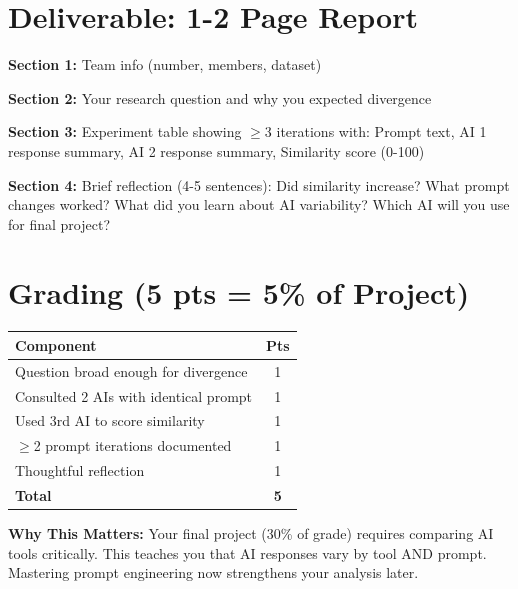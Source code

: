 \documentclass[10pt]{article}
\begin{document}
\section*{Deliverable: 1-2 Page Report}

\textbf{Section 1:} Team info (number, members, dataset)

\textbf{Section 2:} Your research question and why you expected divergence

\textbf{Section 3:} Experiment table showing $\geq$3 iterations with: Prompt text, AI 1 response summary, AI 2 response summary, Similarity score (0-100)

\textbf{Section 4:} Brief reflection (4-5 sentences): Did similarity increase? What prompt changes worked? What did you learn about AI variability? Which AI will you use for final project?

\section*{Grading (5 pts = 5\% of Project)}

\begin{small}
\begin{tabular}{lc}
\toprule
\textbf{Component} & \textbf{Pts} \\
\midrule
Question broad enough for divergence & 1 \\
Consulted 2 AIs with identical prompt & 1 \\
Used 3rd AI to score similarity & 1 \\
$\geq$2 prompt iterations documented & 1 \\
Thoughtful reflection & 1 \\
\midrule
\textbf{Total} & \textbf{5} \\
\bottomrule
\end{tabular}
\end{small}

\vspace{0.3em}
\begin{tcolorbox}[colback=aiblue!5,colframe=aiblue,boxrule=1pt,arc=2pt,left=4pt,right=4pt,top=3pt,bottom=3pt]
\small
\textbf{Why This Matters:} Your final project (30\% of grade) requires comparing AI tools critically. This teaches you that AI responses vary by tool AND prompt. Mastering prompt engineering now strengthens your analysis later.
\end{tcolorbox}
\end{document}

